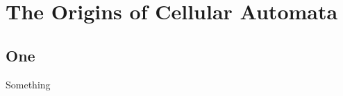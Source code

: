 \chapter{The Origins of Cellular Automata}
\section{One}
Something\cite{ionreq_smoothlife_2012}\cite{chan_lenia_2019}\cite{andrew_trevorrow_golly_2022}\cite{mantelas_using_2012}
\cite{bedau_open_2000}


